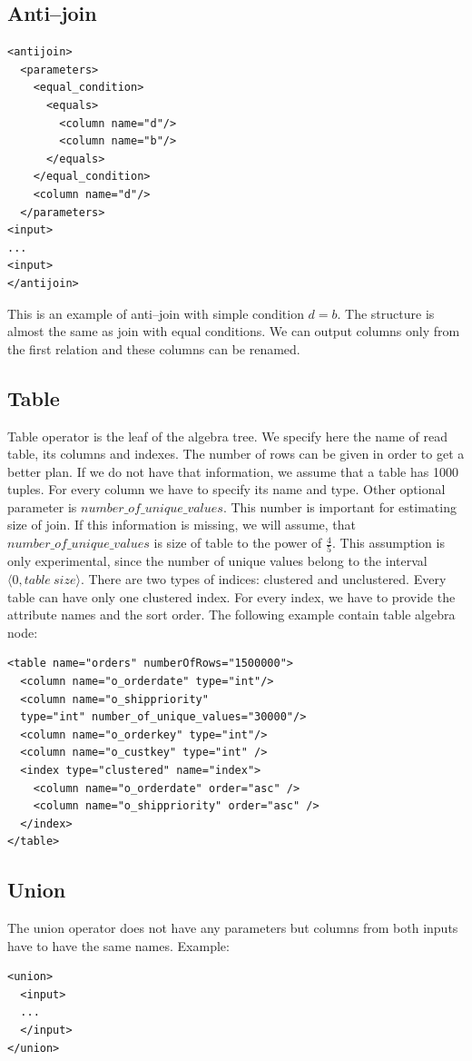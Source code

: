 \subsection{Anti--join}

\begin{lstlisting}
<antijoin>
  <parameters>
    <equal_condition>
      <equals>
        <column name="d"/>
        <column name="b"/>
      </equals>
    </equal_condition>
    <column name="d"/>
  </parameters>
<input>
...
<input>
</antijoin>
\end{lstlisting}
This is an example of anti--join with simple condition $d=b$. The structure is almost the same as join with equal conditions. We can output columns only from the first relation and these columns can be renamed.

\subsection{Table}
Table operator is the leaf of the algebra tree. We specify here the name of read table, its columns and indexes. The number of rows can be given in order to get a better plan. If we do not have that information, we assume that a table has 1000 tuples. For every column we have to specify its name and type. Other optional parameter is $number\_of\_unique\_values$. This number is important for estimating size of join. If this information is missing, we will assume, that $number\_of\_unique\_values$ is size of table to the power of $\frac{4}{5}$. This assumption is only experimental, since the number of unique values belong to the interval $\langle 0, table~size\rangle$. There are two types of indices: clustered and  unclustered. Every table can have only one clustered index. For every index, we have to provide the attribute names and the sort order. The following example contain table algebra node:
 
\begin{lstlisting}
<table name="orders" numberOfRows="1500000">
  <column name="o_orderdate" type="int"/>
  <column name="o_shippriority" 
  type="int" number_of_unique_values="30000"/>
  <column name="o_orderkey" type="int"/>
  <column name="o_custkey" type="int" />
  <index type="clustered" name="index">
    <column name="o_orderdate" order="asc" />
    <column name="o_shippriority" order="asc" />
  </index>
</table>
\end{lstlisting}

\subsection{Union}
The union operator does not have any parameters but columns from both inputs have to have the same names. Example:
\begin{lstlisting}
<union>
  <input>
  ...
  </input>
</union>
\end{lstlisting}

